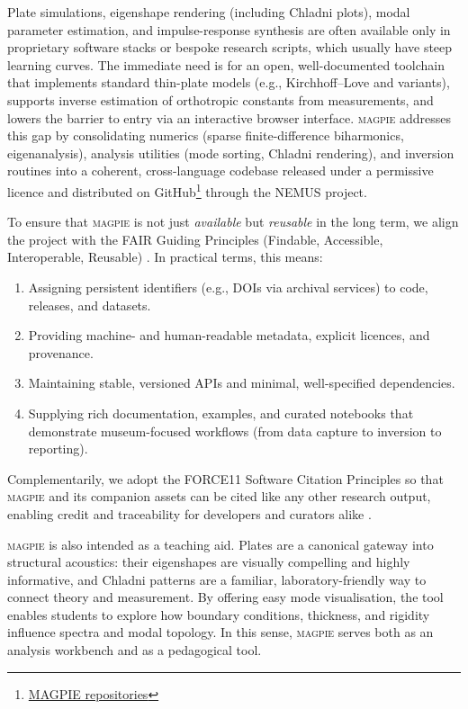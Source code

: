 Plate simulations, eigenshape rendering (including Chladni plots), modal parameter estimation, and impulse-response synthesis are often available only in proprietary software stacks or bespoke research scripts, which usually have steep learning curves. The immediate need is for an open, well-documented toolchain that implements standard thin-plate models (e.g., Kirchhoff–Love and variants), supports inverse estimation of orthotropic constants from measurements, and lowers the barrier to entry via an interactive browser interface. \textsc{magpie} addresses this gap by consolidating numerics (sparse finite-difference biharmonics, eigenanalysis), analysis utilities (mode sorting, Chladni rendering), and inversion routines into a coherent, cross-language codebase released under a permissive licence and distributed on GitHub\footnote{ \href{https://github.com/orgs/Nemus-Project/teams/magpie/repositories}{MAGPIE repositories}} through the \textsc{NEMUS} project.

To ensure that \textsc{magpie} is not just \emph{available} but \emph{reusable} in the long term, we align the project with the FAIR Guiding Principles (Findable, Accessible, Interoperable, Reusable) \cite{wilkinson_fair_2016,go_fair_2016}. In practical terms, this means: 
\begin{enumerate}
\item Assigning persistent identifiers (e.g., DOIs via archival services) to code, releases, and datasets. 
\item Providing machine- and human-readable metadata, explicit licences, and provenance.
\item Maintaining stable, versioned APIs and minimal, well-specified dependencies. \item Supplying rich documentation, examples, and curated notebooks that demonstrate museum-focused workflows (from data capture to inversion to reporting). 
\end{enumerate}
Complementarily, we adopt the FORCE11 Software Citation Principles so that \textsc{magpie} and its companion assets can be cited like any other research output, enabling credit and traceability for developers and curators alike \cite{smith_software_2016}.

\textsc{magpie} is also intended as a teaching aid. Plates are a canonical gateway into structural acoustics: their eigenshapes are visually compelling and highly informative, and Chladni patterns are a familiar, laboratory-friendly way to connect theory and measurement. By offering easy mode visualisation, the tool enables students to explore how boundary conditions, thickness, and rigidity influence spectra and modal topology. In this sense, \textsc{magpie} serves both as an analysis workbench and as a pedagogical tool.

